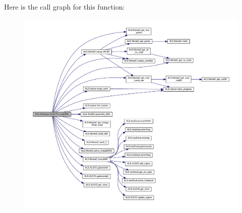 Here is the call graph for this function\+:
\nopagebreak
\begin{figure}[H]
\begin{center}
\leavevmode
\includegraphics[width=350pt]{class_a_l_s_1_1_a_l_sclass_1_1_a_l_s_c_p_d_ae3a5c74ea1f38eb721aebd2fc6aba8a9_cgraph}
\end{center}
\end{figure}



